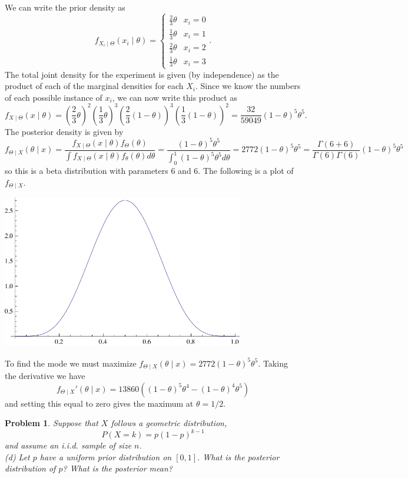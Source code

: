 \documentclass{article}
\newtheorem{problem}{Problem}
\begin{document}
We can write the prior density as
\[
f_{X_i \mid \Theta} (x_i \mid \theta) =
\begin{cases}
\frac{2}{3} \theta & x_i = 0\\
\frac{1}{3} \theta & x_i = 1\\
\frac{2}{3} \theta & x_i = 2\\
\frac{1}{3} \theta & x_i = 3
\end{cases}.
\]
The total joint density for the experiment is given (by independence) as the product of each of the marginal densities for each $X_i$. Since we know the numbers of each possible instance of $x_i$, we can now write this product as
\[
f_{X \mid \Theta} (x \mid \theta) = \left ( \frac{2}{3} \theta \right )^2 \left ( \frac{1}{3} \theta \right )^3 \left ( \frac{2}{3} (1 - \theta) \right )^3 \left ( \frac{1}{3} (1 - \theta) \right )^2 = \frac{32}{59049} (1-\theta)^5 \theta^5.
\]
The posterior density is given by
\[
f_{\Theta \mid X}(\theta \mid x) = \frac{f_{X \mid \Theta}(x \mid \theta) f_{\Theta}(\theta)}{\int f_{X \mid \Theta}(x \mid \theta) f_{\theta}(\theta) d \theta} = \frac{(1-\theta)^5 \theta^5}{\int_0^1 (1-\theta)^5 \theta^5 d \theta} = 2772 (1-\theta)^5 \theta^5 = \frac{\Gamma(6 + 6)}{\Gamma(6) \Gamma(6)} (1-\theta)^5 \theta^5
\]
so this is a beta distribution with parameters $6$ and $6$. The following is a plot of $f_{\Theta \mid X}$.
\begin{center}
\includegraphics[width=300pt]{plot.pdf}
\end{center}
To find the mode we must maximize $f_{\Theta \mid X}(\theta \mid x) = 2772 (1-\theta)^5 \theta^5$. Taking the derivative we have
\[
f_{\Theta \mid X}'(\theta \mid x) = 13860 ((1-\theta)^5 \theta^4 - (1-\theta)^4 \theta^5)
\]
and setting this equal to zero gives the maximum at $\theta = 1/2$.

\begin{problem}
Suppose that $X$ follows a geometric distribution,
\[
P(X = k) = p(1-p)^{k-1}
\]
and assume an i.i.d. sample of size $n$.\\
(d) Let $p$ have a uniform prior distribution on $[0,1]$. What is the posterior distribution of $p$? What is the posterior mean?
\end{problem}
\end{document}
